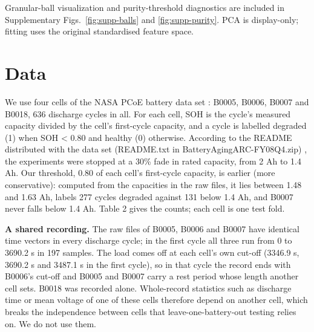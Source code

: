 \documentclass[conference,a4paper]{IEEEtran}
\begin{document}
Granular-ball visualization and purity-threshold diagnostics are included in Supplementary Figs.~\ref{fig:supp-balls} and \ref{fig:supp-purity}. PCA is display-only; fitting uses the original standardised feature space.

\section{Data}

We use four cells of the NASA PCoE battery data set \cite{r10}: B0005, B0006, B0007 and B0018, 636 discharge cycles in all. For each cell, SOH is the cycle's measured capacity divided by the cell's first-cycle capacity, and a cycle is labelled degraded (1) when SOH < 0.80 and healthy (0) otherwise. According to the README distributed with the data set (README.txt in BatteryAgingARC-FY08Q4.zip) \cite{r10}, the experiments were stopped at a 30\% fade in rated capacity, from 2 Ah to 1.4 Ah. Our threshold, 0.80 of each cell's first-cycle capacity, is earlier (more conservative): computed from the capacities in the raw files, it lies between 1.48 and 1.63 Ah, labels 277 cycles degraded against 131 below 1.4 Ah, and B0007 never falls below 1.4 Ah. Table 2 gives the counts; each cell is one test fold.

\begin{table}[!t]
\centering
\small
\caption{Cycles and labels per cell, and what one misclassified cycle costs in test accuracy.}
\label{tab:2}
\end{table}

\textbf{A shared recording.} The raw files of B0005, B0006 and B0007 have identical time vectors in every discharge cycle; in the first cycle all three run from 0 to 3690.2 s in 197 samples. The load comes off at each cell's own cut-off (3346.9 s, 3690.2 s and 3487.1 s in the first cycle), so in that cycle the record ends with B0006's cut-off and B0005 and B0007 carry a rest period whose length another cell sets. B0018 was recorded alone. Whole-record statistics such as discharge time or mean voltage of one of these cells therefore depend on another cell, which breaks the independence between cells that leave-one-battery-out testing relies on. We do not use them.
\end{document}
